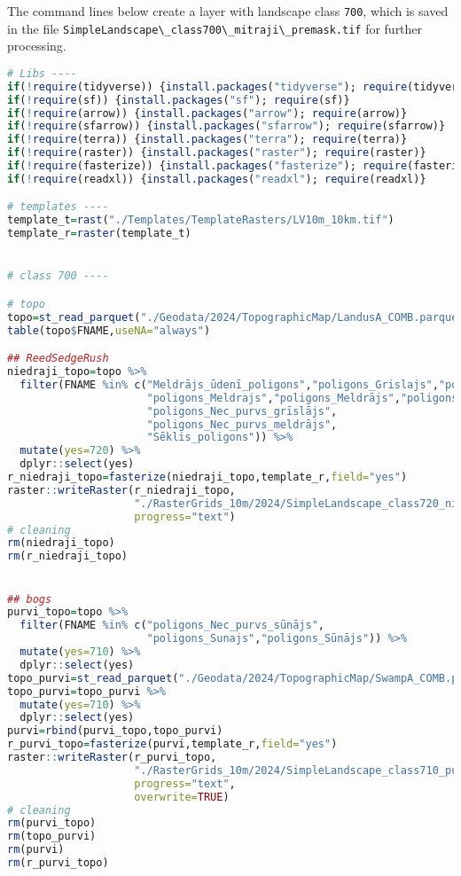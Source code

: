 \documentclass[
]{book}
\newcommand{\passthrough}[1]{#1}
\begin{document}
The command lines below create a layer with landscape class \passthrough{\lstinline!700!}, which is saved
in the file \passthrough{\lstinline!SimpleLandscape\_class700\_mitraji\_premask.tif!} for further processing.

\begin{lstlisting}[language=R]
# Libs ----
if(!require(tidyverse)) {install.packages("tidyverse"); require(tidyverse)}
if(!require(sf)) {install.packages("sf"); require(sf)}
if(!require(arrow)) {install.packages("arrow"); require(arrow)}
if(!require(sfarrow)) {install.packages("sfarrow"); require(sfarrow)}
if(!require(terra)) {install.packages("terra"); require(terra)}
if(!require(raster)) {install.packages("raster"); require(raster)}
if(!require(fasterize)) {install.packages("fasterize"); require(fasterize)}
if(!require(readxl)) {install.packages("readxl"); require(readxl)}

# templates ----
template_t=rast("./Templates/TemplateRasters/LV10m_10km.tif")
template_r=raster(template_t)


# class 700 ----

# topo
topo=st_read_parquet("./Geodata/2024/TopographicMap/LandusA_COMB.parquet")
table(topo$FNAME,useNA="always")

## ReedSedgeRush
niedraji_topo=topo %>% 
  filter(FNAME %in% c("Meldrājs_ūdenī_poligons","poligons_Grislajs","poligons_Grīslājs",
                      "poligons_Meldrajs","poligons_Meldrājs","poligons_Meldrajs_udeni",
                      "poligons_Nec_purvs_grīslājs",
                      "poligons_Nec_purvs_meldrājs",
                      "Sēklis_poligons")) %>% 
  mutate(yes=720) %>% 
  dplyr::select(yes)
r_niedraji_topo=fasterize(niedraji_topo,template_r,field="yes")
raster::writeRaster(r_niedraji_topo,
                    "./RasterGrids_10m/2024/SimpleLandscape_class720_niedraji_topo.tif",
                    progress="text")
# cleaning
rm(niedraji_topo)
rm(r_niedraji_topo)


## bogs
purvi_topo=topo %>% 
  filter(FNAME %in% c("poligons_Nec_purvs_sūnājs",
                      "poligons_Sunajs","poligons_Sūnājs")) %>% 
  mutate(yes=710) %>% 
  dplyr::select(yes)
topo_purvi=st_read_parquet("./Geodata/2024/TopographicMap/SwampA_COMB.parquet")
topo_purvi=topo_purvi %>% 
  mutate(yes=710) %>% 
  dplyr::select(yes)
purvi=rbind(purvi_topo,topo_purvi)
r_purvi_topo=fasterize(purvi,template_r,field="yes")
raster::writeRaster(r_purvi_topo,
                    "./RasterGrids_10m/2024/SimpleLandscape_class710_purvi_topo.tif",
                    progress="text",
                    overwrite=TRUE)
# cleaning
rm(purvi_topo)
rm(topo_purvi)
rm(purvi)
rm(r_purvi_topo)



\end{lstlisting}
\end{document}
